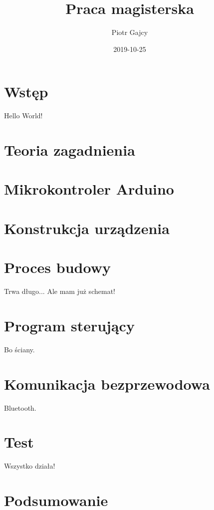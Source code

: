 \documentclass[a4paper, 12pt]{report}
\begin{document}
\title{Praca magisterska}
\date{2019-10-25}
\author{Piotr Gajcy}

  \maketitle
  \newpage
  \tableofcontents
  \newpage
  
\chapter*{Wstęp}
Hello World!

\chapter{Teoria zagadnienia}
 
\chapter{Mikrokontroler Arduino}

\chapter{Konstrukcja urządzenia}

\chapter{Proces budowy}
Trwa długo... Ale mam już schemat!
\chapter{Program sterujący}
Bo ściany.
\chapter{Komunikacja bezprzewodowa}
Bluetooth.
\chapter{Test}
Wszystko działa!
\chapter*{Podsumowanie}


\listoffigures
\listoftables



\end{document}
